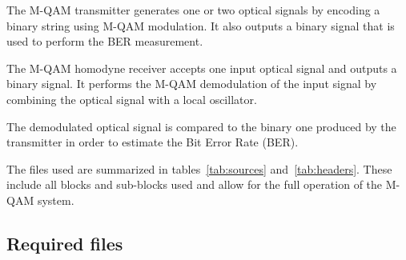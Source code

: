 The M-QAM transmitter generates one or two optical signals by encoding a binary string using M-QAM modulation. It also outputs a binary signal that is used to perform the BER measurement.

The M-QAM homodyne receiver accepts one input optical signal and outputs
a binary signal. It performs the M-QAM demodulation of the input signal by combining the optical signal with a local oscillator.

The demodulated optical signal is compared to the binary one produced by the transmitter in order to estimate the Bit Error Rate (BER).

The files used are summarized in tables~\ref{tab:sources} and~\ref{tab:headers}. These include all blocks and sub-blocks used and allow for the full operation of the M-QAM system.

\subsection*{Required files}\label{Required files}

